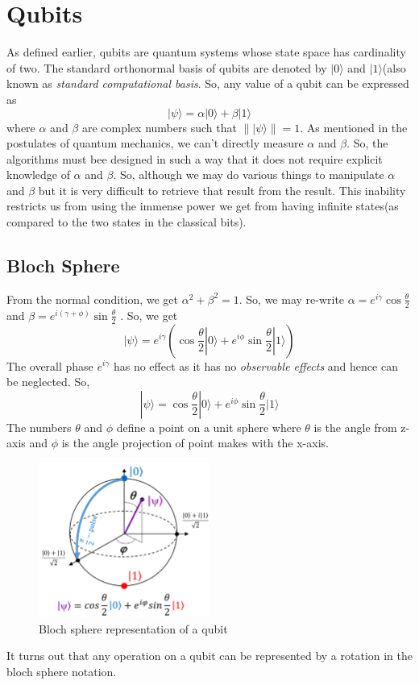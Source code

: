 \section{Qubits}
As defined earlier, qubits are quantum systems whose state space has cardinality of two. The standard orthonormal basis of qubits are denoted by $|0\rangle$ and $|1\rangle$(also known as \textit{standard computational basis}. So, any value of a qubit can be expressed as
\begin{equation}
|\psi\rangle = \alpha | 0\rangle + \beta |1 \rangle
\end{equation}
where $\alpha$ and $\beta$ are complex numbers such that $\| |\psi \rangle \| =1$. As mentioned in the postulates of quantum mechanics, we can't directly measure $\alpha$ and $\beta$. So,  the algorithms must bee designed in such a way that it does not require explicit knowledge of $\alpha$ and $\beta$. So, although we may do various things to manipulate $\alpha$ and $\beta$ but it is very difficult to retrieve that result from the result. This inability restricts us from using the immense power we get from having infinite states(as compared to the two states in the classical bits).
\subsection{Bloch Sphere}
From the normal condition, we get $\alpha^2  + \beta^2 =1$. So, we may re-write $\alpha = e^{i\gamma} \cos{\frac{\theta}{2}} $ and $\beta = e^{i(\gamma+\phi)} \sin{\frac{\theta}{2}} $ . So, we get
\begin{equation}
|\psi \rangle = e^{i\gamma} \left( \cos{\frac{\theta}{2}} |0\rangle + e^{i\phi} \sin{\frac{\theta}{2}} |1\rangle \right)
\end{equation}The overall phase $e^{i\gamma}$ has no effect as it has no \textit{observable effects} and hence can be neglected. So,
\begin{equation}
|\psi \rangle = \cos{\frac{\theta}{2}} |0\rangle + e^{i\phi} \sin{\frac{\theta}{2}} |1\rangle 
\end{equation}
The numbers $\theta$ and $\phi$ define a point on a unit sphere where $\theta$ is the angle from z-axis and $\phi$ is the angle projection of point makes with the x-axis. 
\begin{figure}[t]
\centering
\includegraphics[width=0.5\textwidth]{images/blochsphere.png}\par
\label{blochsphere}
\caption{Bloch sphere representation of a qubit}
\end{figure}
It turns out that any operation on a qubit can be represented by a rotation in the bloch sphere notation. 
